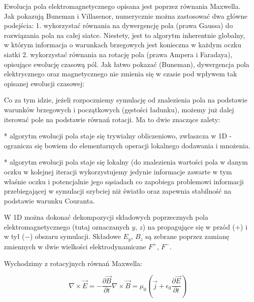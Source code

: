     Ewolucja pola elektromagnetycznego opisana jest poprzez równania Maxwella.
    Jak pokazują Buneman i Villasenor, numerycznie można zastosować dwa główne
    podejścia:  1. wykorzystać równania na dywergencję
    pola (prawa Gaussa) do rozwiązania pola na całej siatce. Niestety, jest to
    algorytm inherentnie globalny, w którym informacja o warunkach brzegowych
    jest konieczna w każdym oczku siatki
    2. wykorzystać równania na rotację pola (prawa Ampera i Faradaya), opisujące ewolucję czasową pól. Jak łatwo pokazać (Buneman),
    dywergencja pola elektrycznego oraz magnetycznego nie zmienia się w czasie pod wpływem tak opisanej ewolucji czasowej:

    Co za tym idzie, jeżeli rozpoczniemy symulację od znalezienia pola na
    podstawie warunków brzegowych i początkowych (gęstości ładunku), możemy już
    dalej iterować pole na podstawie równań rotacji. Ma to dwie znaczące
    zalety:
    
    * algorytm ewolucji pola staje się trywialny obliczeniowo,
    zwłaszcza w 1D - ogranicza się bowiem do elementarnych operacji lokalnego
    dodawania i mnożenia.
    
    * algorytm ewolucji pola staje się lokalny (do
    znalezienia wartości pola w danym oczku w kolejnej iteracji wykorzystujemy
    jedynie informacje zawarte w tym właśnie oczku i potencjalnie jego
    sąsiadach  co zapobiega
    problemowi informacji przebiegającej w symulacji szybciej niż światło oraz
    zapewnia stabilność na podstawie
    warunku Couranta.

    W 1D można dokonać dekompozycji składowych poprzecznych pola
    elektromagnetycznego (tutaj oznaczanych $y$, $z$) na propagujące się w
    przód ($+$) i w tył ($-$) obszaru symulacji. Składowe $E_y$, $B_z$ są
    zebrane poprzez zamianę zmiennych w dwie wielkości elektrodynamiczne $F^+$,
    $F^-$.

    Wychodzimy z rotacyjnych równań Maxwella:

    \begin{equation}
        \nabla \times \vec{E} = -\frac{\partial \vec{B}}{\partial t}
        \nabla \times \vec{B} = \mu_0 (\vec{j} + \epsilon_0 \frac{\partial \vec{E}}{\partial t})
        \label{eqn:Maxwell-rotation-derivation}
    \end{equation}

